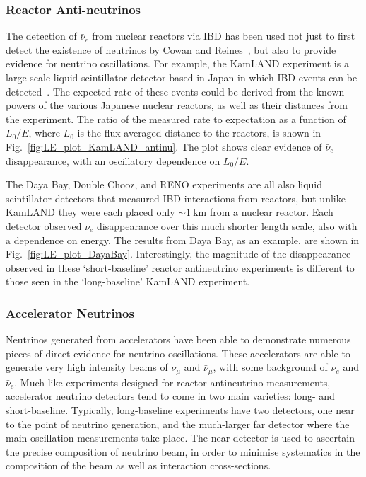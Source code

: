 \subsubsection{Reactor Anti-neutrinos}
The detection of $\bar{\nu}_{e}$ from nuclear reactors via IBD has been used not just to first detect the existence of neutrinos by Cowan and Reines~\cite{cowanDetectionFreeNeutrino1956,reinesNeutrino1956}, but also to provide evidence for neutrino oscillations. For example, the KamLAND experiment is a large-scale liquid scintillator detector based in Japan in which IBD events can be detected~\cite{}. %
The expected rate of these events could be derived from the known powers of the various Japanese nuclear reactors, as well as their distances from the experiment. The ratio of the measured rate to expectation as a function of $L_{0}/E$, where $L_{0}$ is the flux-averaged distance to the reactors, is shown in Fig.~\ref{fig:LE_plot_KamLAND_antinu}. The plot shows clear evidence of $\bar{\nu}_{e}$ disappearance, with an oscillatory dependence on $L_{0}/E$.

The Daya Bay, Double Chooz, and RENO experiments are all also liquid scintillator detectors that measured IBD interactions from reactors, but unlike KamLAND they were each placed only $\sim\SI{1}{\km}$ from a nuclear reactor. Each detector observed $\bar{\nu}_{e}$ disappearance over this much shorter length scale, also with a dependence on energy. The results from Daya Bay, as an example, are shown in Fig.~\ref{fig:LE_plot_DayaBay}. Interestingly, the magnitude of the disappearance observed in these `short-baseline' reactor antineutrino experiments is different to those seen in the `long-baseline' KamLAND experiment.

\subsubsection{Accelerator Neutrinos}
Neutrinos generated from accelerators have been able to demonstrate numerous pieces of direct evidence for neutrino oscillations. These accelerators are able to generate very high intensity beams of $\nu_{\mu}$ and $\bar{\nu}_{\mu}$, with some background of $\nu_{e}$ and $\bar{\nu}_{e}$. Much like experiments designed for reactor antineutrino measurements, accelerator neutrino detectors tend to come in two main varieties: long- and short-baseline. Typically, long-baseline experiments have two detectors, one near to the point of neutrino generation, and the much-larger far detector where the main oscillation measurements take place. The near-detector is used to ascertain the precise composition of neutrino beam, in order to minimise systematics in the composition of the beam as well as interaction cross-sections.

